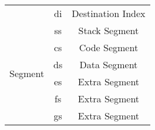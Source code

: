 \documentclass[11pt,a5paper,footinclude=true,headinclude=true]{scrbook} %
\begin{document}
\begin{center}
\begin{tabular}{|c|c|c|c|}
		\cline{2-4}
		                                  & \multicolumn{2}{c|}{\multirow{2}{*}{di}} & \multirow{2}{*}{Destination Index} \\
		                                  & \multicolumn{2}{c|}{}                    &                                    \\
		\hline
		\multirow{6}{*}{Segment}          & \multicolumn{2}{c|}{ss}                  & Stack Segment                      \\
		\cline{2-4}
		                                  & \multicolumn{2}{c|}{cs}                  & Code Segment                       \\
		\cline{2-4}
		                                  & \multicolumn{2}{c|}{ds}                  & Data Segment                       \\
		\cline{2-4}
		                                  & \multicolumn{2}{c|}{es}                  & Extra Segment                      \\
		\cline{2-4}
		                                  & \multicolumn{2}{c|}{fs}                  & Extra Segment                      \\
		\cline{2-4}
		                                  & \multicolumn{2}{c|}{gs}                  & Extra Segment                      \\
		\hline
	\end{tabular}
\end{center}
\end{document}
